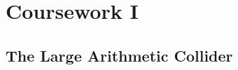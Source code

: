 
\newcommand{\deadlineOneTime}{noon}
\newcommand{\deadlineOneDate}{11 February 2021}
\newcommand{\submissionOneURL}{https://tabula.warwick.ac.uk/coursework/submission/43213a10-18dc-4e87-8364-c648097af402}
\newcommand{\classroomOneURL}{https://classroom.github.com/a/eQTilEdh}



\cleardoublepage
\chapter{Coursework I}

\section{The Large Arithmetic Collider}

